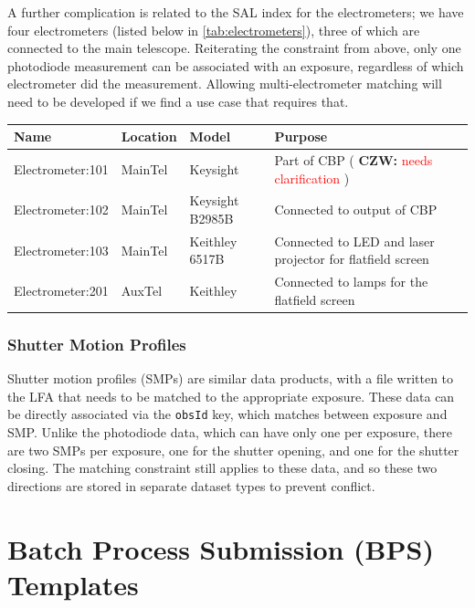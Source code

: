 \documentclass[DM,authoryear,toc]{lsstdoc}
\newcommand{\czw}[1]{
  \textbf{CZW: }\textcolor{red}{#1}
}
\begin{document}
A further complication is related to the SAL index for the electrometers; we have four electrometers (listed below in \ref{tab:electrometers}), three of which are connected to the main telescope.
Reiterating the constraint from above, only one photodiode measurement can be associated with an exposure, regardless of which electrometer did the measurement.
Allowing multi-electrometer matching will need to be developed if we find a use case that requires that.

\begin{tabular}{l|l|l|p{}}
  \label{tab:electrometers}
    Name & Location & Model & Purpose \\
    \hline
    Electrometer:101 & MainTel & Keysight & Part of CBP (\czw{needs clarification}) \\
    Electrometer:102 & MainTel & Keysight B2985B & Connected to output of CBP \\
    Electrometer:103 & MainTel & Keithley 6517B & Connected to LED and laser projector for flatfield screen \\
    Electrometer:201 & AuxTel & Keithley & Connected to lamps for the flatfield screen \\
\end{tabular}

\subsubsection{Shutter Motion Profiles}

Shutter motion profiles (SMPs) are similar data products, with a file written to the LFA that needs to be matched to the appropriate exposure.
These data can be directly associated via the \verb|obsId| key, which matches between exposure and SMP.
Unlike the photodiode data, which can have only one per exposure, there are two SMPs per exposure, one for the shutter opening, and one for the shutter closing.
The matching constraint still applies to these data, and so these two directions are stored in separate dataset types to prevent conflict.

\section{Batch Process Submission (BPS) Templates}
\end{document}
